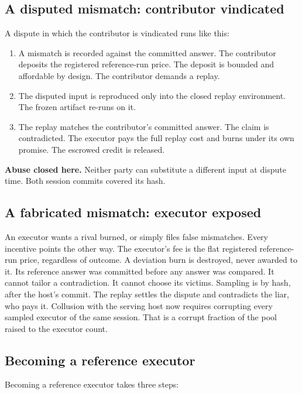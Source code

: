 \documentclass[11pt]{article}
\begin{document}
\subsection{A disputed mismatch: contributor vindicated}

A dispute in which the contributor is vindicated runs like this:

\begin{enumerate}
    \item A mismatch is recorded against the committed answer. The
          contributor deposits the registered reference-run price. The
          deposit is bounded and affordable by design. The contributor
          demands a replay.
    \item The disputed input is reproduced only into the closed
          replay environment. The frozen artifact re-runs on it.
    \item The replay matches the contributor's committed answer. The
          claim is contradicted. The executor pays the full replay cost and
          burns under its own promise. The escrowed credit is released.
\end{enumerate}
\textbf{Abuse closed here.} Neither party can substitute a
different input at dispute time. Both session commits covered its
hash.

\subsection{A fabricated mismatch: executor exposed}

An executor wants a rival burned, or simply files false
mismatches. Every incentive points the other way. The executor's
fee is the flat registered reference-run price, regardless of
outcome. A deviation burn is destroyed, never awarded to it. Its
reference answer was committed before any answer was compared. It
cannot tailor a contradiction. It cannot choose its victims.
Sampling is by hash, after the host's commit. The replay settles
the dispute and contradicts the liar, who pays it. Collusion with
the serving host now requires corrupting every sampled executor
of the same session. That is a corrupt fraction of the pool
raised to the executor count.

\subsection{Becoming a reference executor}

Becoming a reference executor takes three steps:
\end{document}
